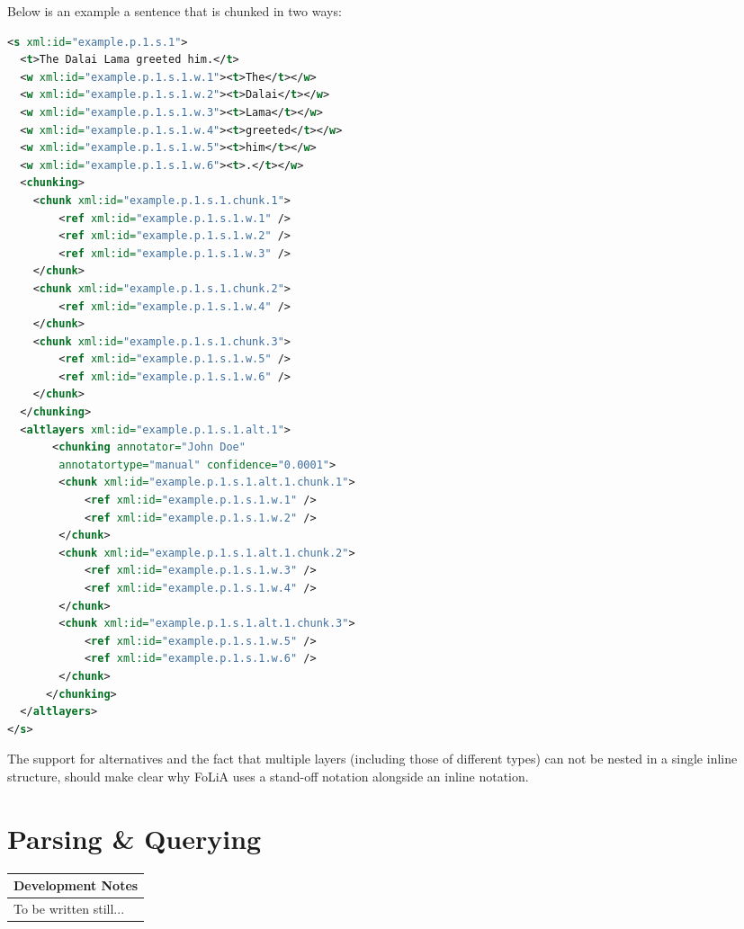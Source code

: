 \documentclass[a4paper,12pt]{report}
\newenvironment{devnotes}
{
\begin{center}
    \begin{tabular}[h!]{|p{0.8\textwidth}|}
    \hline
    {\bf Development Notes}\\\hline}
{   \\\hline
    \end{tabular}
\end{center}}
\begin{document}
Below is an example a sentence that is chunked in two ways:

\begin{lstlisting}[language=xml]
<s xml:id="example.p.1.s.1">
  <t>The Dalai Lama greeted him.</t>
  <w xml:id="example.p.1.s.1.w.1"><t>The</t></w>
  <w xml:id="example.p.1.s.1.w.2"><t>Dalai</t></w>
  <w xml:id="example.p.1.s.1.w.3"><t>Lama</t></w>
  <w xml:id="example.p.1.s.1.w.4"><t>greeted</t></w>
  <w xml:id="example.p.1.s.1.w.5"><t>him</t></w>
  <w xml:id="example.p.1.s.1.w.6"><t>.</t></w>
  <chunking>
    <chunk xml:id="example.p.1.s.1.chunk.1">       
        <ref xml:id="example.p.1.s.1.w.1" />       
        <ref xml:id="example.p.1.s.1.w.2" />       
        <ref xml:id="example.p.1.s.1.w.3" />        
    </chunk>
    <chunk xml:id="example.p.1.s.1.chunk.2">       
        <ref xml:id="example.p.1.s.1.w.4" />
    </chunk>
    <chunk xml:id="example.p.1.s.1.chunk.3">       
        <ref xml:id="example.p.1.s.1.w.5" />
        <ref xml:id="example.p.1.s.1.w.6" />
    </chunk>    
  </chunking>
  <altlayers xml:id="example.p.1.s.1.alt.1">
       <chunking annotator="John Doe" 
        annotatortype="manual" confidence="0.0001">
        <chunk xml:id="example.p.1.s.1.alt.1.chunk.1">       
            <ref xml:id="example.p.1.s.1.w.1" />       
            <ref xml:id="example.p.1.s.1.w.2" />                       
        </chunk>
        <chunk xml:id="example.p.1.s.1.alt.1.chunk.2">       
            <ref xml:id="example.p.1.s.1.w.3" />  
            <ref xml:id="example.p.1.s.1.w.4" />
        </chunk>
        <chunk xml:id="example.p.1.s.1.alt.1.chunk.3">       
            <ref xml:id="example.p.1.s.1.w.5" />
            <ref xml:id="example.p.1.s.1.w.6" />
        </chunk>    
      </chunking>   
  </altlayers>
</s>
\end{lstlisting}

The support for alternatives and the fact that multiple layers (including those of different types) can not be nested in a single inline structure, should make clear why FoLiA uses a stand-off notation alongside an inline notation. 


\chapter{Parsing \& Querying}

\begin{devnotes}
To be written still...
\end{devnotes}





\end{document}
